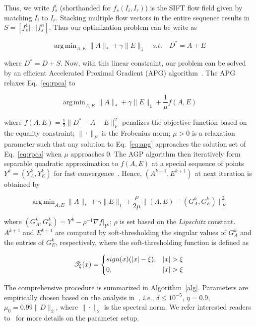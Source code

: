 \documentclass[journal]{IEEEtran}
\DeclareMathOperator*{\argmin}{arg\,min}
\begin{document}
Thus, we write $f_s^i$ (shorthanded for $f_s(I_i,I_r)$) is the SIFT flow field given by matching $I_i$ to $I_r$. Stacking multiple flow vectors in the entire sequence results in $S = [f_s^1 | \cdots | f_s^n]$. Thus our optimization problem can be write as

\begin{equation} \label{eq:rpca}
\argmin_{A,E} \|A\|_*+\gamma \|E\|_1  \quad s.t. \quad D^* = A + E 
\end{equation}

where $D^*=D+S$. Now, with this linear constraint, our problem can be solved by an efficient Accelerated Proximal Gradient (APG) algorithm~\cite{Beck09}\cite{Toh09}\cite{Lin09}. The APG relaxes Eq.~\ref{eq:rpca} to

\begin{equation} \label{eq:apg}
\argmin_{A,E} \|A\|_* + \gamma \|E\|_1 + \frac{1}{\mu}f(A,E)
\end{equation}

\noindent where $f(A,E)=\frac{1}{2}\|D^*-A-E\|^2_F$ penalizes the objective function based on the equality constraint; $\|\cdot\|_F$ is the Frobenius norm; $\mu>0$ is a relaxation parameter such that any solution to Eq.~\ref{eq:apg} approaches the solution set of Eq.~\ref{eq:rpca} when $\mu$ approaches 0. The AGP algorithm then iteratively form separable quadratic approximation to $f(A,E)$ at a special sequence of points $Y^k=(Y^k_A,Y^k_E)$ for fast convergence~\cite{Beck09}. Hence, $(A^{k+1},E^{k+1})$ at next iteration is obtained by

\begin{equation} \label{eq:apg_fast}
\argmin_{A,E} \|A\|_* + \gamma \|E\|_1 + \frac{\rho}{2\mu}\|(A,E)-(G^k_A,G^k_E)\|^2_F
\end{equation}

\noindent where $(G^k_A,G^k_E)=Y^k-\rho^{-1}\nabla f|_{Y^k}$; $\rho$ is set based on the \textit{Lipschitz} constant. $A^{k+1}$ and $E^{k+1}$ are computed by soft-thresholding the singular values of $G^k_A$ and the entries of $G^k_E$, respectively, where the soft-thresholding function is defined as

\begin{equation}
\mathscr{T}_\xi(x)=
	\begin{dcases}
    sign(x)(|x|-\xi),  	& |x|>\xi \\
    0,  								& |x|>\xi
	\end{dcases}
\end{equation}

The comprehensive procedure is summarized in Algorithm~\ref{alg}. Parameters are empirically chosen based on the analysis in~\cite{Lin09}, \textit{i.e.}, $\delta\leq10^{-5}$, $\eta=0.9$, $\mu_0=0.99\|D\|_2$, where $\|\cdot\|_2$ is the spectral norm. We refer interested readers to~\cite{Lin09} for more details on the parameter setup. 
\end{document}
